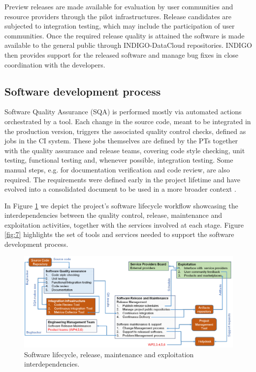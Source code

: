 \documentclass{article}
\begin{document}
Preview releases are made available for evaluation by user communities and
resource providers through the pilot infrastructures. Release
candidates are subjected to integration testing, which may include the
participation of user communities. Once the required release quality is
attained the software is made available to the general public through
INDIGO-DataCloud repositories. INDIGO then provides support for the released
software and manage bug fixes in close coordination with the developers.


\subsection{Software development process}


Software Quality Assurance (SQA) is performed mostly via
automated actions orchestrated by a tool. Each change in the source code,
meant to be integrated in the production version, triggers the associated
quality control checks, defined as jobs in the CI system. These jobs
themselves are defined by the PTs together with the quality assurance and
release teams, covering code style checking,
unit testing, functional testing and, whenever possible, integration testing.
Some manual steps, e.g. for documentation verification and code review, are
also required. The requirements were defined early in the
project lifetime and have evolved into a consolidated document to be
used in a more broader context \cite{SQA}.

In Figure \ref{fig:6} we depict the project's software
lifecycle workflow showcasing the interdependencies between
the quality control, release, maintenance and exploitation activities, together
with the services involved at each stage. Figure \ref{fig:7} highlights the set of tools and services needed to support the software development process.


\begin{figure}
  \centering
  \includegraphics[width=\textwidth]{./figs/Figure6.pdf}
  \caption{Software lifecycle, release, maintenance and exploitation interdependencies.}
  \label{fig:6}
\end{figure}
\end{document}
